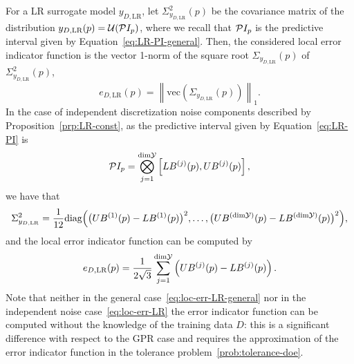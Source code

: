 For a LR surrogate model $y_{D,\text{LR}}$, let $\Sigma^2_{y_{D,\text{LR}}}(p)$ be the covariance matrix of the distribution $y_{D,\text{LR}}(p) = \mathcal U (\mathcal PI_p)$, where we recall that $\mathcal PI_p$ is the predictive interval given by Equation~\eqref{eq:LR-PI-general}.\newline
Then, the considered local error indicator function is the vector 1-norm of the square root $\Sigma_{y_{D,\text{LR}}}(p)$ of $\Sigma^2_{y_{D,\text{LR}}}(p)$,
\begin{equation} \label{eq:loc-err-LR-general}
    e_{D, \text{LR}}(p) = \left\| \text{vec}(\Sigma_{y_{D,\text{LR}}}(p)) \right\|_1.
\end{equation}
In the case of independent discretization noise components described by Proposition~\ref{prp:LR-const}, as the predictive interval given by Equation~\eqref{eq:LR-PI} is
\begin{equation*}
    \mathcal PI_p = \bigotimes_{j=1}^{\text{dim}\mathcal Y} \left[ LB^{(j)}(p), UB^{(j)}(p)\right],
\end{equation*}
we have that
\[
    \Sigma^2_{y_{D,\text{LR}}} = \frac{1}{12} \text{diag} \Big ( \big( UB^{(1)}(p) - LB^{(1)}(p)\big)^2, \dots,\big( UB^{(\text{dim}\mathcal Y)}(p) - LB^{(\text{dim}\mathcal Y)}(p) \big)^2 \Big),
\] and the local error indicator function can be computed by 
\begin{equation} \label{eq:loc-err-LR}
    e_{D, \text{LR}}(p) = \frac{1}{2\sqrt{3}} \sum_{j=1}^{\text{dim}\mathcal Y} \left( UB^{(j)}(p) - LB^{(j)}(p) \right).
\end{equation}
Note that neither in the general case~\eqref{eq:loc-err-LR-general} nor in the independent noise case~\eqref{eq:loc-err-LR} the error indicator function can be computed without the knowledge of the training data $D$: this is a significant difference with respect to the GPR case and requires the approximation of the error indicator function in the tolerance problem~\eqref{prob:tolerance-doe}.\medbreak

